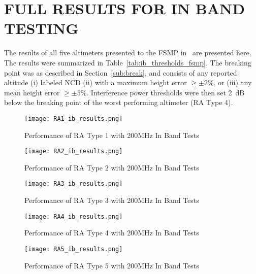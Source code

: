 %
%
%
%



\chapter{\uppercase{Full Results for In Band Testing}}\label{appendix_a}

The results of all five altimeters presented to the FSMP in~\cite{schwark_radio_2019} are presented here. The results were summarized in Table~\ref{tab:ib_thresholds_fsmp}. The breaking point was as described in Section~\ref{sub:break}, and consists of any reported altitude (i) labeled NCD (ii) with a maximum height error $\geq\pm2\%$, or (iii) any mean height error $\geq\pm5\%$. Interference power thresholds were then set 2~dB below the breaking point of the worst performing altimeter (RA Type 4). 
 \begin{figure}[h!]
	\centering
	\texttt{[image: RA1\_ib\_results.png]}
	\caption{Performance of RA Type 1 with 200MHz In Band Tests}
	\label{fig:RA1}
\end{figure}

 \begin{figure}[h!]
	\centering
	\texttt{[image: RA2\_ib\_results.png]}
	\caption{Performance of RA Type 2 with 200MHz In Band Tests}
	\label{fig:RA2}
\end{figure}

 \begin{figure}[h!]
	\centering
	\texttt{[image: RA3\_ib\_results.png]}
	\caption{Performance of RA Type 3 with 200MHz In Band Tests}
	\label{fig:RA3}
\end{figure}

 \begin{figure}[h!]
	\centering
	\texttt{[image: RA4\_ib\_results.png]}
	\caption{Performance of RA Type 4 with 200MHz In Band Tests}
	\label{fig:RA4_appendix}
\end{figure}

 \begin{figure}[h!]
	\centering
	\texttt{[image: RA5\_ib\_results.png]}
	\caption{Performance of RA Type 5 with 200MHz In Band Tests}
	\label{fig:RA5}
\end{figure}
